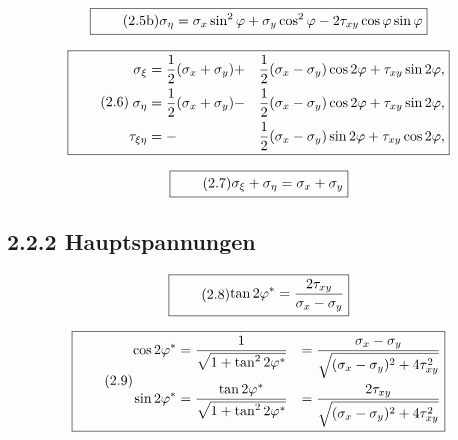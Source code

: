\documentclass[11pt]{article}
\newcommand{\1}{ {\mathds{1}} }
\begin{document}
    \begin{equation}
      \boxed{
        \tag{2.5b}
        \begin{split}
          \sigma_{\eta}
          =
          \sigma_{x} \sin^2 \varphi + \sigma_y \cos^2 \varphi - 2 \tau_{xy} \cos\varphi\sin\varphi
        \end{split}
      }
    \end{equation}

    \begin{equation}
      \boxed{
        \tag{2.6}
        \begin{split}
          \sigma_{\xi} &= \frac{1}{2} (\sigma_x + \sigma_y) +&\frac{1}{2}(\sigma_x - \sigma_y) \cos 2 \varphi + \tau_{xy} \sin 2 \varphi, \\
          \sigma_{\eta} &= \frac{1}{2} (\sigma_x + \sigma_y) -&\frac{1}{2}(\sigma_x - \sigma_y) \cos 2 \varphi + \tau_{xy} \sin 2 \varphi,\\
          \tau_{\xi \eta} &= -&\frac{1}{2}(\sigma_x - \sigma_y) \sin 2 \varphi + \tau_{xy} \cos 2 \varphi,
        \end{split}
      }
    \end{equation}
    
    \begin{equation}
      \boxed{
        \tag{2.7}
        \begin{split}
          \sigma_\xi + \sigma_\eta
          =
          \sigma_x + \sigma_y
        \end{split}
      }
    \end{equation}

    \subsection*{2.2.2 Hauptspannungen}
    
    \begin{equation}
      \boxed{
        \tag{2.8}
        \begin{split}
          \tan 2\varphi^\ast
          =
          \frac{2 \tau_{xy}}{\sigma_x - \sigma_y}
        \end{split}
      }
    \end{equation}

    \begin{equation}
      \boxed{
        \tag{2.9}
        \begin{split}
          \cos 2\varphi^\ast
          &=
          \frac{1}{\sqrt{1+ \tan^2 2\varphi^\ast}}
          &=
          \frac{\sigma_x - \sigma_y}{\sqrt{(\sigma_x - \sigma_y)^2 + 4 \tau_{xy}^2}} \\
          \sin 2\varphi^\ast
          &=
          \frac{\tan 2\varphi^\ast}{\sqrt{1+ \tan^2 2\varphi^\ast}}
          &=
          \frac{2\tau_{xy}}{\sqrt{(\sigma_x - \sigma_y)^2 + 4 \tau_{xy}^2}} \\          
        \end{split}
      }
    \end{equation}
\end{document}
